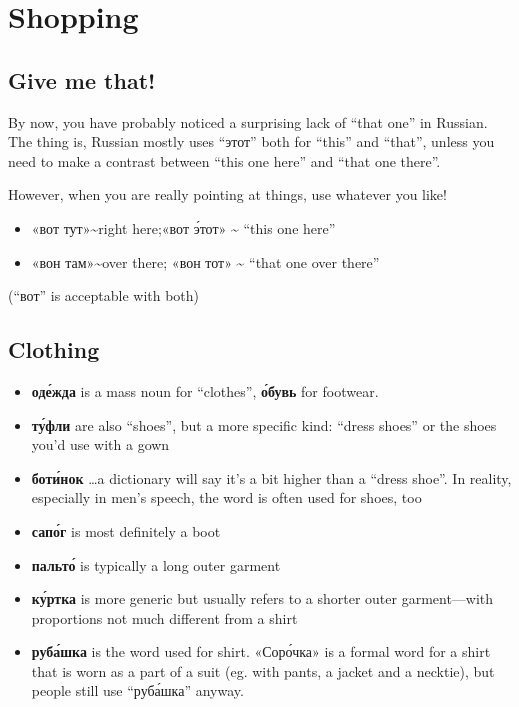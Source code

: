 \chapter{Shopping}\label{shopping}

\section{Give me that!}\label{give-me-that}

By now, you have probably noticed a surprising lack of ``that one'' in
Russian. The thing is, Russian mostly uses ``этот'' both for ``this''
and ``that'', unless you need to make a contrast between ``this one
here'' and ``that one there''.

However, when you are really pointing at things, use whatever you like!

\begin{itemize}
\tightlist
\item
  «вот тут»\textasciitilde{}right here;«вот \'{э}тот» \textasciitilde{}
  ``this one here''
\item
  «вон там»\textasciitilde{}over there; «вон тот» \textasciitilde{}
  ``that one over there''
\end{itemize}

(``вот'' is acceptable with both)

\section{Clothing}\label{clothing}

\begin{itemize}
\tightlist
\item
  \textbf{од\'{е}жда} is a mass noun for ``clothes'', \textbf{\'{о}бувь} for
  footwear.
\item
  \textbf{т\'{у}фли} are also ``shoes'', but a more specific kind: ``dress
  shoes'' or the shoes you'd use with a gown
\item
  \textbf{бот\'{и}нок} \ldots{}a dictionary will say it's a bit higher than
  a ``dress shoe''. In reality, especially in men's speech, the word is
  often used for shoes, too
\item
  \textbf{сап\'{о}г} is most definitely a boot
\item
  \textbf{пальт\'{о}} is typically a long outer garment
\item
  \textbf{к\'{у}ртка} is more generic but usually refers to a shorter outer
  garment---with proportions not much different from a shirt
\item
  \textbf{руб\'{а}шка} is the word used for shirt. «Сор\'{о}чка» is a formal
  word for a shirt that is worn as a part of a suit (eg. with pants, a
  jacket and a necktie), but people still use ``руб\'{а}шка'' anyway.
\end{itemize}

